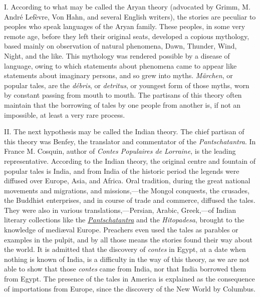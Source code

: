 \documentclass[14pt,a4paper]{memoir}
\newcommand{\ul}[1]{\uline{#1}}
\begin{document}
{{I. According to what may be called the Aryan theory (advocated by Grimm,
M. André Lefèvre, Von Hahn, and several English writers), the stories
are peculiar to peoples who speak languages of the Aryan family. These
peoples, in some very remote age, before they left their original seats,
developed a copious mythology, based mainly on observation of natural
phenomena, Dawn, Thunder, Wind, Night, and the like. This mythology was
rendered possible by a \textquotesingle disease of
language,\textquotesingle{} owing to which statements about phenomena
came to appear like statements about imaginary persons, and so grew into
myths. \emph{Märchen}, or popular tales, are the \emph{débris}, or
\emph{detritus}, or youngest form of those myths, worn by constant
passing from mouth to mouth. The partisans of this theory often maintain
that the borrowing of tales by one people from another is, if not an
impossible, at least a very rare process.

II. The next hypothesis may be called the Indian theory. The chief
partisan of this theory was Benfey, the translator and commentator of
the \emph{Pantschatantra}. In France M. Cosquin, author of \emph{Contes
Populaires de Lorraine}, is the leading representative. According to the
Indian theory, the original centre and fountain of popular tales is
India, and from India of the historic period the legends were diffused
over Europe, Asia, and Africa. Oral tradition, during the great national
movements and migrations, and missions,---the Mongol conquests, the
crusades, the Buddhist enterprises, and in course of trade and commerce,
diffused the tales. They were also in various translations,---Persian,
Arabic, Greek,---of Indian literary collections like the
\ul{\emph{Pantschatantra}} and the \emph{Hitopadesa}, brought to the
knowledge of mediæval Europe. Preachers even used the tales as parables
or \textquotesingle examples\textquotesingle{} in the pulpit, and by all
those means the stories found their way about the world. It is admitted
that the discovery of \emph{contes} in Egypt, at a date when nothing is
known of India, is a difficulty in the way of this theory, as we are not
able to show that those \emph{contes} came from India, nor that India
borrowed them from Egypt. The presence of the tales in America is
explained as the consequence of importations from Europe, since the
discovery of the New World by Columbus.

}}
\end{document}
